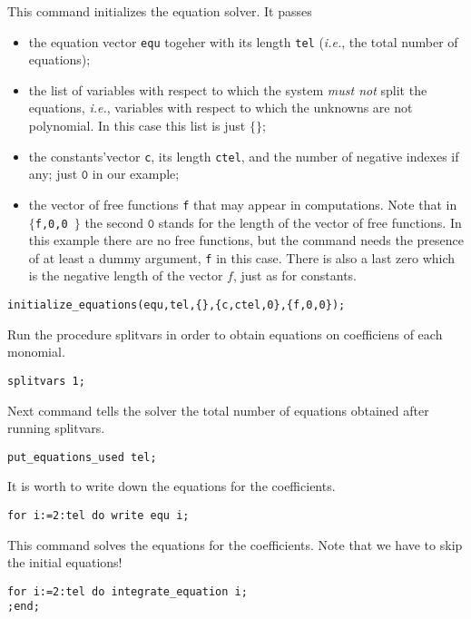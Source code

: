 This command initializes the equation solver.  It passes
\begin{itemize}
  \item the equation vector \texttt{equ} togeher with its length \texttt{tel}
    (\emph{i.e.}, the total number of equations);
  \item the list of variables with respect to which the system \emph{must not}
    split the equations, \emph{i.e.}, variables with respect to which the
    unknowns are not polynomial. In this case this list is just $\{\}$;
  \item the constants'vector \texttt{c}, its length \texttt{ctel}, and the
    number of negative indexes if any; just $\texttt{0}$ in our example;
  \item the vector of free functions \texttt{f} that may appear in
    computations. Note that in \texttt{$\{$f,0,0 $\}$} the second $\texttt{0}$
    stands for the length of the vector of free functions. In this example
    there are no free functions, but the command needs the presence of at least
    a dummy argument, \texttt{f} in this case. There is also a last zero which
    is the negative length of the vector $f$, just as for constants.
  \end{itemize}
\begin{verbatim}
initialize_equations(equ,tel,{},{c,ctel,0},{f,0,0});
\end{verbatim}

Run the procedure splitvars in order to obtain equations on coefficiens
of each monomial.
\begin{verbatim}
splitvars 1;
\end{verbatim}

Next command tells the solver the total number of equations obtained
after running splitvars.
\begin{verbatim}
put_equations_used tel;
\end{verbatim}

It is worth to write down the equations for the coefficients.
\begin{verbatim}
for i:=2:tel do write equ i;
\end{verbatim}

This command solves the equations for the coefficients.
Note that we have to skip the initial equations!
\begin{verbatim}
for i:=2:tel do integrate_equation i;
;end;
\end{verbatim}

